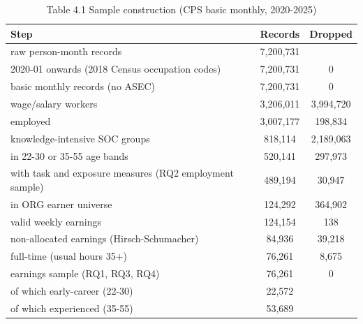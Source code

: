 \begin{table}[htbp]\centering
\caption{Table 4.1 Sample construction (CPS basic monthly, 2020-2025)}
\begin{tabular}{lcc}
\toprule
Step & Records & Dropped \\
\midrule
raw person-month records & 7,200,731 &  \\
2020-01 onwards (2018 Census occupation codes) & 7,200,731 & 0 \\
basic monthly records (no ASEC) & 7,200,731 & 0 \\
wage/salary workers & 3,206,011 & 3,994,720 \\
employed & 3,007,177 & 198,834 \\
knowledge-intensive SOC groups & 818,114 & 2,189,063 \\
in 22-30 or 35-55 age bands & 520,141 & 297,973 \\
with task and exposure measures (RQ2 employment sample) & 489,194 & 30,947 \\
in ORG earner universe & 124,292 & 364,902 \\
valid weekly earnings & 124,154 & 138 \\
non-allocated earnings (Hirsch-Schumacher) & 84,936 & 39,218 \\
full-time (usual hours 35+) & 76,261 & 8,675 \\
earnings sample (RQ1, RQ3, RQ4) & 76,261 & 0 \\
  of which early-career (22-30) & 22,572 &  \\
  of which experienced (35-55) & 53,689 &  \\
\bottomrule
\end{tabular}
\par\vspace{2pt}{\footnotesize Counts of person-month records from the step 05 sample log (an ORG respondent can appear twice, a basic-monthly respondent up to eight times).}
\end{table}

